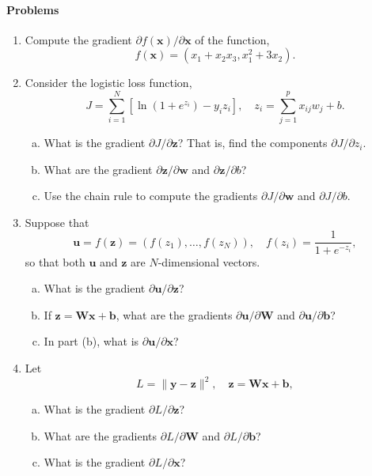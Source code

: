 \documentclass[11pt]{article}
\newcommand{\bbf}{\mathbf{b}}
\newcommand{\ubf}{\mathbf{u}}
\newcommand{\wbf}{\mathbf{w}}
\newcommand{\xbf}{\mathbf{x}}
\newcommand{\ybf}{\mathbf{y}}
\newcommand{\zbf}{\mathbf{z}}
\newcommand{\Wbf}{\mathbf{W}}
\begin{document}
\paragraph*{Problems}
\begin{enumerate}
\item Compute the gradient $\partial f(\xbf)/\partial \xbf$ of the function,
\[
    f(\xbf) = (x_1+x_2x_3,x_1^2+3x_2).
\]

\item Consider the logistic loss function,
\[
      J = \sum_{i=1}^N\left[ \ln(1+e^{z_i}) - y_iz_i \right], \quad z_i = \sum_{j=1}^p x_{ij}w_j + b.
\]
\begin{enumerate}[(a)]
\item What is the gradient $\partial J/\partial \zbf$?  That is, find the components $\partial J/\partial z_i$.
\item What are the gradient $\partial \zbf/\partial \wbf$ and $\partial \zbf/\partial b$?
\item Use the chain rule to compute the gradients $\partial J/\partial \wbf$ and $\partial J/\partial b$.
\end{enumerate}

\item Suppose that
\[
    \ubf = f(\zbf) = (f(z_1),\ldots,f(z_N)), \quad f(z_i) = \frac{1}{1+e^{-z_i}},
\]
so that both $\ubf$ and $\zbf$ are $N$-dimensional vectors.
\begin{enumerate}[(a)]
\item What is the gradient $\partial \ubf/\partial \zbf$?
\item If $\zbf = \Wbf\xbf + \bbf$, what are the gradients $\partial \ubf/\partial \Wbf$ and 
$\partial \ubf/\partial \bbf$?
\item In part (b), what is $\partial \ubf/\partial \xbf$?
\end{enumerate}

\item Let
\[
    L = \|\ybf -\zbf\|^2, \quad \zbf = \Wbf\xbf+\bbf,
\]
\begin{enumerate}[(a)]
\item What is the gradient $\partial L/\partial \zbf$?
\item What are the gradients $\partial L/\partial \Wbf$ and $\partial L/\partial \bbf$?
\item What is the gradient $\partial L/\partial \xbf$?
\end{enumerate}
\end{enumerate}
\end{document}
